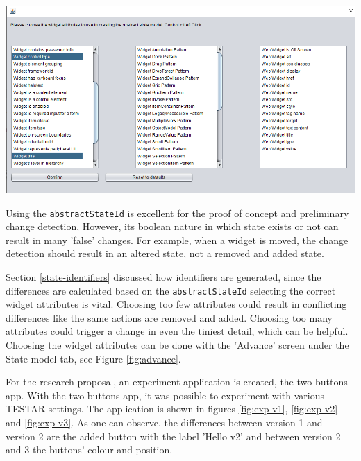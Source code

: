 \begingroup
\captionsetup{type=figure}
\includegraphics[scale=0.5]{pics/attributes-state-model.png}
\label{fig:advance}
\endgroup

Using the \verb|abstractStateId| is excellent for the proof of concept and preliminary change detection, 
However, its boolean nature in which state exists or not can result in many 'false' changes. For example, when a widget is moved, the change detection should result in an altered state, not a removed and added state. 

Section \ref{state-identifiers} discussed how identifiers are generated, since the differences are calculated based on the \verb|abstractStateId| selecting the correct widget attributes is vital. Choosing too few attributes could result in conflicting differences like the same actions are removed and added. Choosing too many attributes could trigger a change in even the tiniest detail, which can be helpful. Choosing the widget attributes can be done with the 'Advance' screen under the State model tab, see Figure \ref{fig:advance}.

For the research proposal, an experiment application is created, the two-buttons app. With the two-buttons app, it was possible to experiment with various TESTAR settings. The application is shown in figures \ref{fig:exp-v1}, \ref{fig:exp-v2} and \ref{fig:exp-v3}. As one can observe, the differences between version 1 and version 2 are the added button with the label 'Hello v2' and between version 2 and 3 the buttons' colour and position. 

